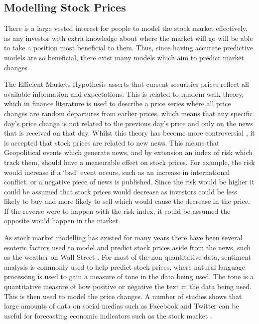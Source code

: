 \subsection{Modelling Stock Prices}
There is a large vested interest for people to model the stock market effectively, as any investor with extra knowledge about where the market will go will be able to take a position most beneficial to them. Thus, since having accurate predictive models are so beneficial, there exist many models which aim to predict market changes.

The Efficient Markets Hypothesis asserts that current securities prices reflect all available information and expectations\cite{fama1960efficient}. This is related to random walk theory, which in finance literature is used to describe a price series where all price changes are random departures from earlier prices, which means that any specific day's price change is not related to the previous day's price and only on the news that is received on that day. Whilst this theory has become more controversial \cite{malkiel2003efficient}, it is accepted that stock prices are related to new news. This means that Geopolitical events which generate news, and by extension an index of risk which track them, should have a measurable effect on stock prices. For example, the risk would increase if a `bad` event occurs, such as an increase in international conflict, or a negative piece of news is published. Since the risk would be higher it could be assumed that stock prices would decrease as investors could be less likely to buy and more likely to sell which would cause the decrease in the price. If the reverse were to happen with the risk index, it could be assumed the opposite would happen in the market.

As stock market modelling has existed for many years there have been several esoteric factors used to model and predict stock prices aside from the news, such as the weather on Wall Street \cite{saunders1993stock}. For most of the non quantitative data, sentiment analysis is commonly used to help predict stock prices, where natural language processing is used to gain a measure of tone in the data being used. The tone is a quantitative measure of how positive or negative the text in the data being used. This is then used to model the price changes. A number of studies shows that large amounts of data on social medias such as Facebook and Twitter can be useful for forecasting economic indicators such as the stock market \cite{bollen2011twitter} \cite{arias2014forecasting}. 


